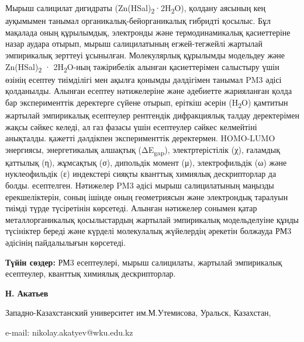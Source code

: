 Мырыш салицилат дигидраты
(Zn(HSal)\textsubscript{2}·2H\textsubscript{2}O), қолдану аясының кең
ауқымымен танымал органикалық-бейорганикалық гибридті қосылыс. Бұл
мақалада оның құрылымдық, электронды және термодинамикалық қасиеттеріне
назар аудара отырып, мырыш салицилатының егжей-тегжейлі жартылай
эмпирикалық зерттеуі ұсынылған. Молекулярлық құрылымды модельдеу және
Zn(HSal)\textsubscript{2} · 2H\textsubscript{2}O-ның тәжірибелік алынған
қасиеттерімен салыстыру үшін өзінің есептеу тиімділігі мен ақылға
қонымды дәлдігімен танымал PM3 әдісі қолданылды. Алынған есептеу
нәтижелеріне және әдебиетте жарияланған қолда бар эксперименттік
деректерге сүйене отырып, еріткіш әсерін (H\textsubscript{2}O) қамтитын
жартылай эмпирикалық есептеулер рентгендік дифракциялық талдау
деректерімен жақсы сәйкес келеді, ал газ фазасы үшін есептеулер сәйкес
келмейтіні анықталды. қажетті дәлдікпен эксперименттік деректермен.
HOMO-LUMO энергиясы, энергетикалық алшақтық (ΔE\textsubscript{gap}),
электртерістілік (χ), ғаламдық қаттылық (η), жұмсақтық (σ), дипольдік
момент (μ), электрофильдік (ω) және нуклеофильдік (ε) индекстері сияқты
кванттық химиялық дескрипторлар да болды. есептелген. Нәтижелер PM3
әдісі мырыш салицилатының маңызды ерекшеліктерін, соның ішінде оның
геометриясын және электрондық таралуын тиімді түрде түсіретінін
көрсетеді. Алынған нәтижелер сонымен қатар металлорганикалық
қосылыстардың жартылай эмпирикалық модельделуіне құнды түсініктер береді
және күрделі молекулалық жүйелердің әрекетін болжауда РМ3 әдісінің
пайдалылығын көрсетеді.

{\bfseries Түйін сөздер:} РМ3 есептеулері, мырыш салицилаты, жартылай
эмпирикалық есептеулер, кванттық химиялық дескрипторлар.


\begin{center}
{\bfseries Н. Акатьев}

Западно-Казахстанский университет им.М.Утемисова, Уральск, Казахстан,

e-mail: nikolay.akatyev@wku.edu.kz
\end{center}

